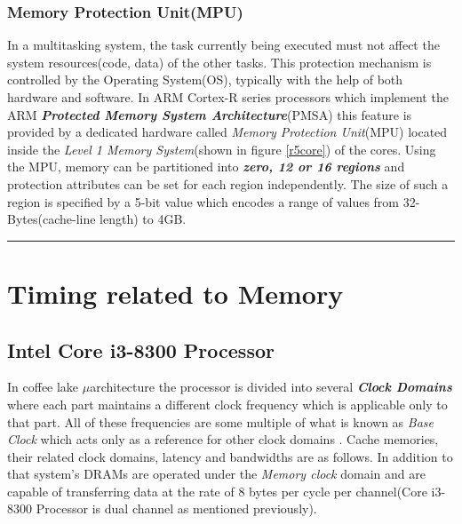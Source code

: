 \documentclass[a4paper,11pt]{article}
\begin{document}
\subsubsection{Memory Protection Unit(MPU)}

In a multitasking system, the task currently being executed must not affect the system resources(code, data) of the other tasks. This protection mechanism is controlled by the Operating System(OS), typically with the help of both hardware and software. In ARM Cortex-R series processors which implement the ARM \textit{\textbf{Protected Memory System Architecture}}(PMSA) this feature is provided by a dedicated hardware called \textit{Memory Protection Unit}(MPU) located inside the \textit{Level 1 Memory System}(shown in figure \ref{r5core}) of the cores. Using the MPU,  memory can be partitioned into \textbf{\textit{zero, 12 or 16 regions}} and protection attributes can be set for each region independently. The size of such a region is specified by a 5-bit value which encodes a range of values from 32-Bytes(cache-line length) to 4GB.
















\vspace{1cm}\hrule
\section{Timing related to Memory}

\subsection{Intel Core i3-8300 Processor}
In coffee lake $\mu$architecture the processor is divided into several \textbf{\textit{Clock Domains}} where each part maintains a different clock frequency which is applicable only to that part. All of these frequencies are some multiple of what is known as \textit{Base Clock} which acts only as a reference for other clock domains\cite{Skylake} . Cache memories, their related clock domains, latency and bandwidths are as follows. In addition to that system's DRAMs are operated under the \textit{Memory clock} domain and are capable of transferring data at the rate of 8 bytes per cycle per channel\cite{Coffee}(Core i3-8300 Processor is dual channel as mentioned previously).
\end{document}
